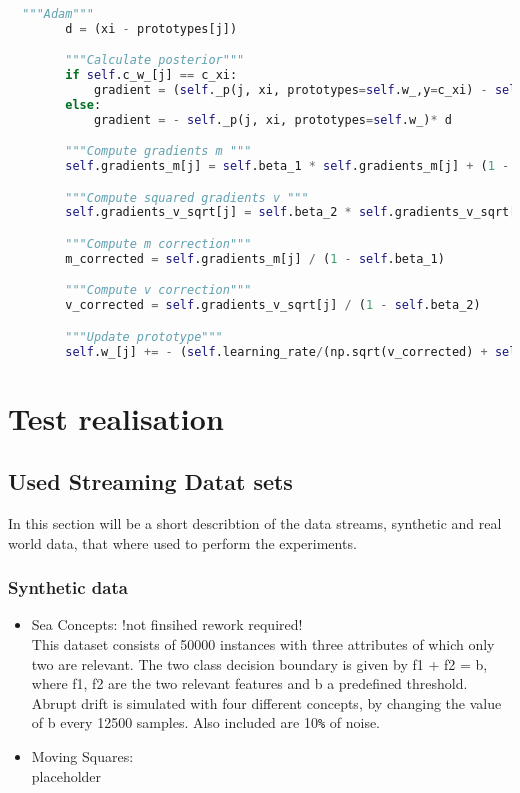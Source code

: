 \documentclass[12pt,oneside,a4paper,parskip]{scrbook}
\begin{document}
\begin{lstlisting}[label=lst:adam,
  language=python,
  firstnumber=1,
  caption= Implementation of Adam on basis of \cite{PassiveDriftonRSLVQ}]			   

  """Adam"""
        d = (xi - prototypes[j])

        """Calculate posterior"""
        if self.c_w_[j] == c_xi:
            gradient = (self._p(j, xi, prototypes=self.w_,y=c_xi) - self._p(j, xi, prototypes=self.w_))* d
        else:
            gradient = - self._p(j, xi, prototypes=self.w_)* d

        """Compute gradients m """
        self.gradients_m[j] = self.beta_1 * self.gradients_m[j] + (1 - self.beta_1) * gradient

        """Compute squared gradients v """
        self.gradients_v_sqrt[j] = self.beta_2 * self.gradients_v_sqrt[j] + (1 - self.beta_2) * gradient ** 2 

        """Compute m correction"""
        m_corrected = self.gradients_m[j] / (1 - self.beta_1)

        """Compute v correction"""
        v_corrected = self.gradients_v_sqrt[j] / (1 - self.beta_2)

        """Update prototype"""
        self.w_[j] += - (self.learning_rate/(np.sqrt(v_corrected) + self.epsilon ))*m_corrected
\end{lstlisting}

\chapter{Test realisation}

\section{Used Streaming Datat sets}

In this section will be a short describtion of the data streams, synthetic and real world data, that where used to 
perform the experiments.

\subsection{Synthetic data}

\begin{itemize}
  \item Sea Concepts: !not finsihed rework required!\\
        This dataset consists of 50000 instances with three attributes of which only two are relevant. 
        The two class decision boundary is given by f1 + f2 = b, where f1, f2 are the two relevant features and b a
        predefined threshold. Abrupt drift is simulated with four different concepts, by changing the value of b every 
        12500 samples. Also included are 10\verb|%| of noise. \cite{SEADataset}
  \item Moving Squares: \\
        placeholder
\end{itemize}
\end{document}
